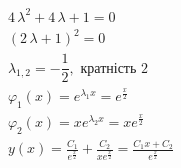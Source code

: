 \documentclass[../rgr_2.tex]{subfiles}
\begin{document}
\Solution

\begin{align}
	4\,\lambda^{2}+4\,\lambda+1=0 \\
	\left({2\,\lambda+1}\right)^{2}=0 \\
	\lambda_{1,2}=-\dfrac{1}{2}, \text{~кратність~} 2 \\ %
	\varphi_1(x)=e^{\lambda_1 x}=e^{\frac{x}{2}} \\
	\varphi_2(x)=x e^{\lambda_2 x}=xe^{\frac{x}{2}} \\
	y(x) = \frac{C_1}{e^{\frac{x}{2}}}
	+\frac{C_2}{xe^{\frac{x}{2}}} =
	\frac{C_1x+C_2}{e^{\frac{x}{2}}}
\end{align}

\end{document}
